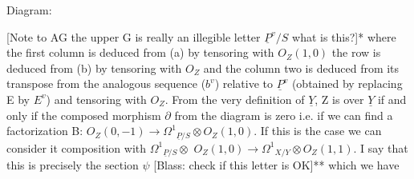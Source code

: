 
Diagram:


[Note to AG the upper G is really an illegible letter  $\underline{P}^{v}/S$
what is this?]*
where the first column is deduced from (a) by tensoring with
$O_Z(1,0)$ the row is deduced from (b) by tensoring with $O_Z$ and the
column two is deduced from its transpose from the analogous
sequence ($b^{v}$) relative to $\underline{P}^{v}$ (obtained by replacing E by $E^{v}$) and
tensoring with $O_Z$.  From the very definition of $\underline{Y}$, Z is over $\underline{Y}$ if
and only if the composed morphism $\partial$ from the diagram is zero i.e.
if we can find a factorization B: $O_Z(0,-1) \rightarrow \Omega^1{}_{\underline{P}/S} \otimes O_Z(1,0)$.  If
this is the case we can consider it composition with $\Omega^1{}_{\underline{P}/S} \otimes$
$O_Z(1,0) \rightarrow \Omega^1{}_{X/Y} \otimes O_Z(1,1)$.  I say that this is precisely the
section $\psi$ [Blass: check if this letter is OK]** which we have

